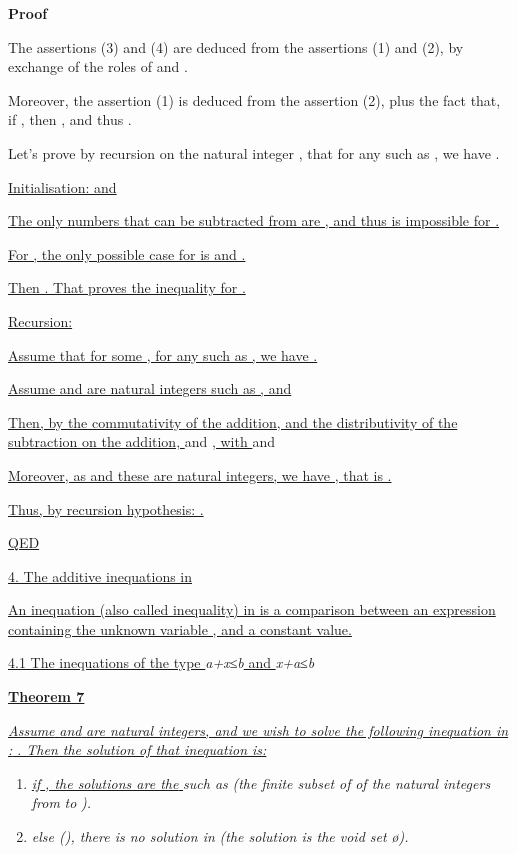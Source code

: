 \documentclass{article}
\providecommand{\tightlist}{%
  \setlength{\itemsep}{0pt}\setlength{\parskip}{0pt}}
\begin{document}
\textbf{Proof}

The assertions (3) and (4) are deduced from the assertions (1) and (2), by exchange of the roles of  and .

Moreover, the assertion (1) is deduced from the assertion (2), plus the fact that, if , then , and thus .

Let’s prove by recursion on the natural integer , that for any  such as , we have .

\ul{Initialisation}\ul{: }\ul{ and }

\ul{The only numbers that can be subtracted from }\ul{ are }\ul{, and thus }\ul{ is impossible for }\ul{.}

\ul{For }\ul{, the only possible case for }\ul{ is }\ul{ and }\ul{.}

\ul{Then }\ul{. That proves the inequality for }\ul{.}





\ul{Recursion}\ul{: }

\ul{Assume that for some }\ul{, for any }\ul{ such as }\ul{, we have }\ul{.}

\ul{Assume }\ul{ and }\ul{ are natural integers such as }\ul{, and }

\ul{Then, by the commutativity of the addition, and the distributivity of the subtraction on the addition, } and \ul{, with } and \ul{ }

\ul{Moreover, as }\ul{ and these are }\ul{natural}\ul{ integers, we have }\ul{ , that is }\ul{.}

\ul{Thus, by recursion hypothesis: }\ul{.}

\ul{QED}

\ul{4. The additive inequations in }

\ul{An inequation (also called inequality) in }\ul{ is a comparison between an expression containing the unknown variable }\ul{, and a constant value.}

\ul{4.1 The inequations of the type }\emph{a+x}\emph{≤}\emph{b}\ul{ and }\emph{x+a}\emph{≤}\emph{b}

\ul{\textbf{Theorem 7}}

\ul{\emph{Assume }}\ul{\emph{ and }}\ul{\emph{ are natural integers, and we wish to solve the following inequation in }}\ul{\emph{: }}\ul{\emph{. Then the solution of that inequation is:}}

\begin{enumerate}
\tightlist
\item \ul{\emph{if }}\ul{\emph{, the solutions are the }}\emph{ such as }\emph{ (the finite subset of }\emph{ of the natural integers from }\emph{ to }\emph{).}
\item \emph{else (}\emph{), there is no solution in }\emph{ (the solution is the void set }\emph{ø}\emph{).}
\end{enumerate}
\end{document}
